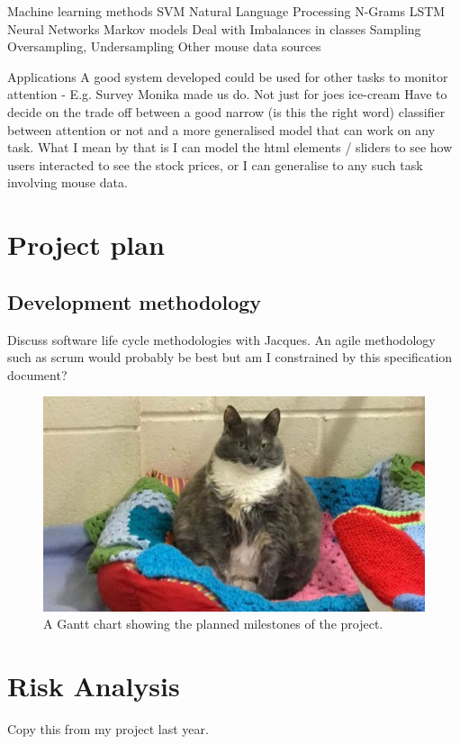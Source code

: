 \documentclass{article}
\begin{document}
Machine learning methods
    SVM
    Natural Language Processing
    N-Grams
    LSTM Neural Networks
    Markov models
Deal with Imbalances in classes
    Sampling
    Oversampling, Undersampling
Other mouse data sources

Applications
A good system developed could be used for other tasks to monitor attention - E.g. Survey Monika made us do. Not just for joes ice-cream
Have to decide on the trade off between a good narrow (is this the right word) classifier between attention or not and a more generalised model that can work on any task.
What I mean by that is I can model the html elements / sliders to see how users interacted to see the stock prices, or I can generalise to any such task involving mouse data.


\section{Project plan}

\subsection{Development methodology}
Discuss software life cycle methodologies with Jacques.
An agile methodology such as scrum would probably be best but am I constrained  by this specification document?

\begin{figure}[ht]
    \centering
    \includegraphics[scale=0.35]{Test.JPG}
    \caption{A Gantt chart showing the planned milestones of the project.}
    \label{fig:Gantt}
\end{figure}

\section{Risk Analysis}
Copy this from my project last year.
\end{document}
